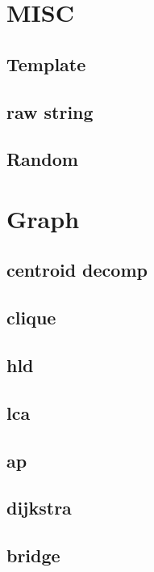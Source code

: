 \section{MISC}
\subsection{Template}

\subsection{raw string}

\subsection{Random}


\section{Graph}
\subsection{centroid decomp}

\subsection{clique}

\subsection{hld}

\subsection{lca}

\subsection{ap}

\subsection{dijkstra}

\subsection{bridge}

